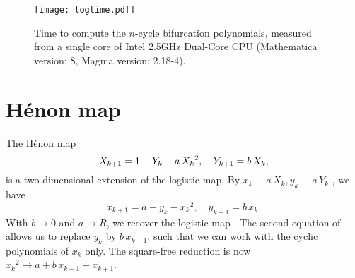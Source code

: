 \documentclass{ws-ijbc}
\begin{document}
\begin{figure}[h]
  \begin{center}
  \begin{minipage}{\linewidth}
        \texttt{[image: logtime.pdf]}
  \end{minipage}%
  \end{center}
  \caption{\label{fig:logtime}
  Time to compute the $n$-cycle bifurcation polynomials,
    measured from a single core of
    Intel\textsuperscript{\textregistered} 2.5GHz Dual-Core CPU
  (Mathematica version: 8, Magma version: 2.18-4).
  }
\end{figure}
%










\section{\label{sec:henon}H\'enon map}




The H\'enon map \cite{henon}
\begin{equation}
  X_{k+1} = 1 + Y_k - a \, {X_k}^2, \quad
  Y_{k+1} = b \, X_k,
\notag
\end{equation}
is a two-dimensional extension of the logistic map.
%
By
  $x_k \equiv a \, X_k,
   y_k \equiv a \, Y_k$
\cite{huang},
we have
\begin{equation}
  x_{k+1} = a + y_k - {x_k}^2, \quad
  y_{k+1} = b \, x_k.
\label{eq:henons}
\end{equation}
%
%
With $b \rightarrow 0$ and $a \rightarrow R$,
we recover the logistic map .
%
%
The second equation of 
allows us to replace $y_k$ by $b \, x_{k-1}$,
  such that we can work with the cyclic polynomials of $x_k$ only.
The square-free reduction is now
  ${x_k}^2 \rightarrow a + b \, x_{k-1} - x_{k+1}$.
\end{document}
